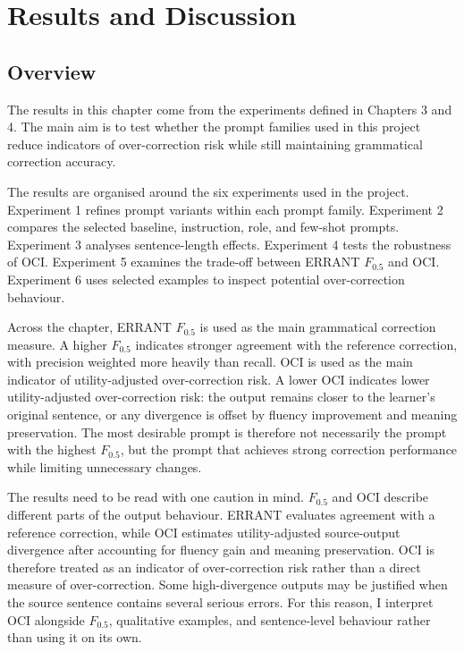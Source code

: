 \chapter{Results and Discussion}

\section{Overview}

The results in this chapter come from the experiments defined in Chapters 3 and 4. The main aim is to test whether the prompt families used in this project reduce indicators of over-correction risk while still maintaining grammatical correction accuracy.

The results are organised around the six experiments used in the project. Experiment 1 refines prompt variants within each prompt family. Experiment 2 compares the selected baseline, instruction, role, and few-shot prompts. Experiment 3 analyses sentence-length effects. Experiment 4 tests the robustness of OCI. Experiment 5 examines the trade-off between ERRANT $F_{0.5}$ and OCI. Experiment 6 uses selected examples to inspect potential over-correction behaviour.

Across the chapter, ERRANT $F_{0.5}$ is used as the main grammatical correction measure. A higher $F_{0.5}$ indicates stronger agreement with the reference correction, with precision weighted more heavily than recall. OCI is used as the main indicator of utility-adjusted over-correction risk. A lower OCI indicates lower utility-adjusted over-correction risk: the output remains closer to the learner's original sentence, or any divergence is offset by fluency improvement and meaning preservation. The most desirable prompt is therefore not necessarily the prompt with the highest $F_{0.5}$, but the prompt that achieves strong correction performance while limiting unnecessary changes.

The results need to be read with one caution in mind. $F_{0.5}$ and OCI describe different parts of the output behaviour. ERRANT evaluates agreement with a reference correction, while OCI estimates utility-adjusted source-output divergence after accounting for fluency gain and meaning preservation. OCI is therefore treated as an indicator of over-correction risk rather than a direct measure of over-correction. Some high-divergence outputs may be justified when the source sentence contains several serious errors. For this reason, I interpret OCI alongside $F_{0.5}$, qualitative examples, and sentence-level behaviour rather than using it on its own.

